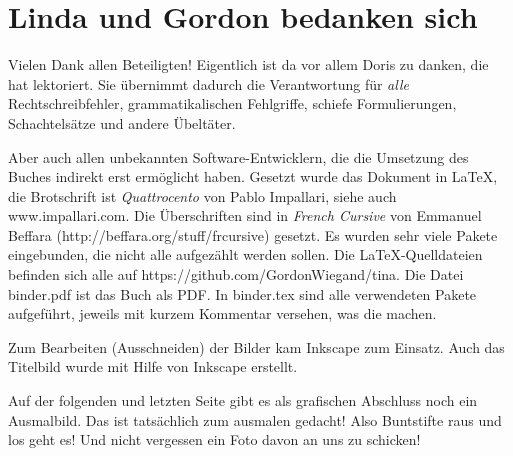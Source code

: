 \chapter*{\large\textsf{Linda und Gordon bedanken sich}}
        \thispagestyle{empty}

Vielen Dank allen Beteiligten! Eigentlich ist da vor allem Doris zu danken, die hat lektoriert. Sie übernimmt dadurch die Verantwortung für \emph{alle} Rechtschreibfehler, grammatikalischen Fehlgriffe, schiefe Formulierungen, Schachtelsätze und andere Übeltäter.

Aber auch allen unbekannten Software-Entwicklern, die die Umsetzung des Buches indirekt erst ermöglicht haben. Gesetzt wurde das Dokument in \LaTeX, die Brotschrift ist \emph{Quattrocento} von Pablo Impallari, siehe auch www.impallari.com. Die Überschriften sind in \emph{French Cursive} von Emmanuel Beffara (http://beffara.org/stuff/frcursive) gesetzt. Es wurden sehr viele Pakete eingebunden, die nicht alle aufgezählt werden sollen. Die \LaTeX-Quelldateien befinden sich alle auf https://github.com/GordonWiegand/tina. Die Datei binder.pdf ist das Buch als PDF. In binder.tex sind alle verwendeten Pakete aufgeführt, jeweils mit kurzem Kommentar versehen, was die machen.


Zum Bearbeiten (Ausschneiden) der Bilder kam Inkscape zum Einsatz. Auch das Titelbild wurde mit Hilfe von Inkscape erstellt. 
        \thispagestyle{empty}

Auf der folgenden und letzten Seite gibt es als grafischen Abschluss noch ein Ausmalbild. Das ist tatsächlich zum ausmalen gedacht! Also Buntstifte raus und los geht es! Und nicht vergessen ein Foto davon an uns zu schicken!


